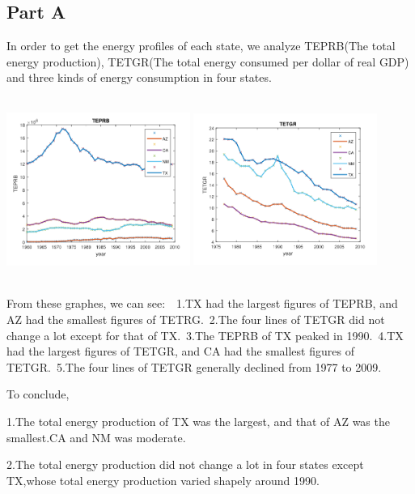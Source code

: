 \documentclass[12pt]{article}
\begin{document}
\subsection{Part \uppercase\expandafter{}  A}



In order to get the energy profiles of each state, we analyze TEPRB(The total energy production), TETGR(The total energy consumed per dollar of real GDP) and three kinds of energy consumption in four states.

\includegraphics[width=6cm,height=6cm]{a1.png}
\includegraphics[width=6cm,height=6cm]{a2.png}

From these graphes, we can see:\ \ 1.TX had the largest figures of TEPRB, and AZ had the smallest figures of TETRG.\ 2.The four lines of TETGR did not change a lot except for that of TX.\ 3.The TEPRB of TX peaked in 1990.\ 4.TX had the largest figures of TETGR, and CA had the smallest figures of TETGR.\ 5.The four lines of TETGR generally declined from 1977 to 2009.

To conclude,

1.The total energy production of TX was the largest, and that of AZ was the smallest.CA and NM was moderate.

2.The total energy production did not change a lot in four states except TX,whose total energy production varied shapely around 1990.
\end{document}
